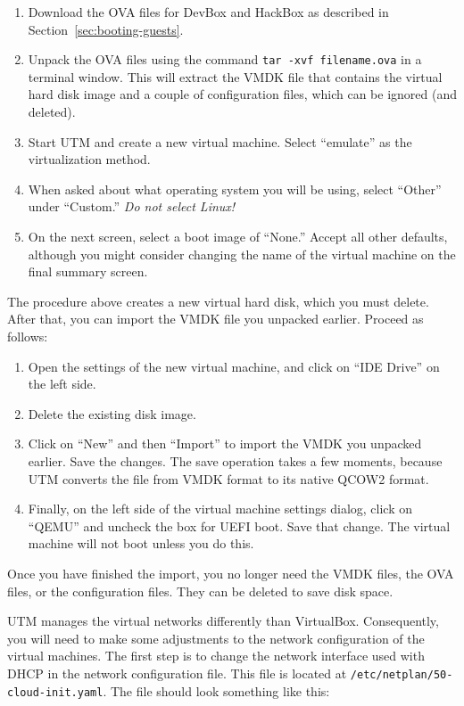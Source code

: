 \documentclass{article}
\newcommand{\command}[1]{\texttt{#1}}
\newcommand{\filename}[1]{\texttt{#1}}
\begin{document}
\begin{enumerate}
\item Download the OVA files for DevBox and HackBox as described in
Section~\ref{sec:booting-guests}.
\item Unpack the OVA files using the command \command{tar -xvf filename.ova} in a terminal
window. This will extract the VMDK file that contains the virtual hard disk image and a couple
of configuration files, which can be ignored (and deleted).
\item Start UTM and create a new virtual machine. Select ``emulate'' as the virtualization
method.
\item When asked about what operating system you will be using, select ``Other'' under
``Custom.''
\emph{Do not select Linux!}
\item On the next screen, select a boot image of ``None.'' Accept all other defaults, although you
might consider changing the name of the virtual machine on the final summary screen. 
\end{enumerate}

The procedure above creates a new virtual hard disk, which you must delete. After that, you can
import the VMDK file you unpacked earlier. Proceed as follows:

\begin{enumerate}
\item Open the settings of the new virtual machine, and click on ``IDE Drive'' on the left side.
\item Delete the existing disk image.
\item Click on ``New'' and then ``Import'' to import the VMDK you unpacked earlier. Save the
changes. The save operation takes a few moments, because UTM converts the file from VMDK format
to its native QCOW2 format.
\item Finally, on the left side of the virtual machine settings dialog, click on ``QEMU'' and
uncheck the box for UEFI boot. Save that change. The virtual machine will not boot unless you do
this.
\end{enumerate}

Once you have finished the import, you no longer need the VMDK files, the OVA files, or the
configuration files. They can be deleted to save disk space.

UTM manages the virtual networks differently than VirtualBox. Consequently, you will need to
make some adjustments to the network configuration of the virtual machines. The first step is to
change the network interface used with DHCP in the network configuration file. This file is
located at \filename{/etc/netplan/50-cloud-init.yaml}. The file should look something like this:
\end{document}
